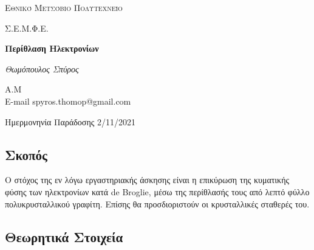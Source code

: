 \documentclass[a4paper]{article}
\begin{document}
\begin{titlepage}			%
	\centering
	{\scshape\LARGE Εθνικό Μετσόβιο Πολυτεχνείο\par}
	{\scshape \LARGE Σ.Ε.Μ.Φ.Ε.\par}
	\vspace{1cm}
	{\huge\bfseries Περίθλαση Ηλεκτρονίων \par}
	\vspace{1cm}
	{\Large\itshape Θωμόπουλος Σπύρος\par}		%
	
	{\large A.M \hfill \\ E-mail spyros.thomop@gmail.com \\}%
	\vspace{1cm}
	{\large Ημερμονηνία Παράδοσης 2/11/2021\par}
\end{titlepage}


\newpage 

\subsection*{Σκοπός}
Ο στόχος της εν λόγω εργαστηριακής άσκησης είναι η επικύρωση της κυματικής φύσης των ηλεκτρονίων κατά de Broglie, μέσω της περίθλασής τους από λεπτό φύλλο πολυκρυσταλλικού γραφίτη. Επίσης θα προσδιοριστούν οι κρυσταλλικές σταθερές του.


\subsection*{Θεωρητικά Στοιχεία}
\end{document}
